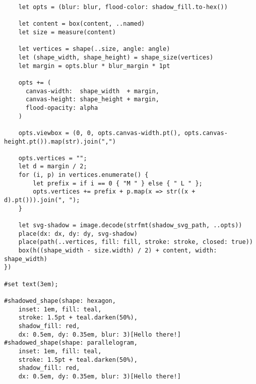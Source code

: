 \begin{verbatim}
    let opts = (blur: blur, flood-color: shadow_fill.to-hex())
       
    let content = box(content, ..named)
    let size = measure(content)

    let vertices = shape(..size, angle: angle)
    let (shape_width, shape_height) = shape_size(vertices)
    let margin = opts.blur * blur_margin * 1pt

    opts += (
      canvas-width:  shape_width  + margin,
      canvas-height: shape_height + margin,
      flood-opacity: alpha
    )

    opts.viewbox = (0, 0, opts.canvas-width.pt(), opts.canvas-height.pt()).map(str).join(",")

    opts.vertices = "";
    let d = margin / 2;
    for (i, p) in vertices.enumerate() {
        let prefix = if i == 0 { "M " } else { " L " };
        opts.vertices += prefix + p.map(x => str((x + d).pt())).join(", ");
    }

    let svg-shadow = image.decode(strfmt(shadow_svg_path, ..opts))
    place(dx: dx, dy: dy, svg-shadow)
    place(path(..vertices, fill: fill, stroke: stroke, closed: true))
    box(h((shape_width - size.width) / 2) + content, width: shape_width)
})

#set text(3em);

#shadowed_shape(shape: hexagon,
    inset: 1em, fill: teal,
    stroke: 1.5pt + teal.darken(50%),
    shadow_fill: red,
    dx: 0.5em, dy: 0.35em, blur: 3)[Hello there!]
#shadowed_shape(shape: parallelogram,
    inset: 1em, fill: teal,
    stroke: 1.5pt + teal.darken(50%),
    shadow_fill: red,
    dx: 0.5em, dy: 0.35em, blur: 3)[Hello there!]
\end{verbatim}

\pandocbounded{}

